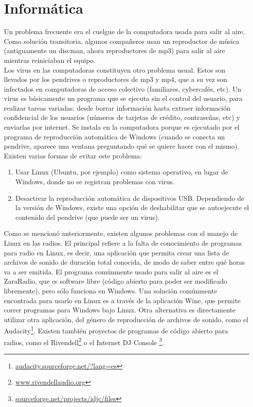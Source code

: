 \section{Informática}

\indent Un problema frecuente era el cuelgue de la computadora usada para salir al aire. Como solución transitoria, algunos compañeros usan un reproductor de música (antiguamente un discman, ahora reproductores de mp3) para salir al aire mientras reiniciaban el equipo.\\

\indent Los virus en las computadoras constituyen otro problema usual. Estos son llevados por los pendrives o reproductores de mp3 y mp4, que a su vez son infectados en computadoras de acceso colectivo (familiares, cybercafés, etc). Un virus es básicamente un programa que se ejecuta sin el control del usuario, para realizar tareas variadas: desde borrar información hasta extraer información confidencial de los usuarios (números de tarjetas de crédito, contraseñas, etc) y enviarlas por internet. Se instala en la computadora porque es ejecutado por el programa de reproducción automática de Windows (cuando se conecta un pendrive, aparece una ventana preguntando qué se quiere hacer con el mismo).\\

Existen varias formas de evitar este problema:

\begin{enumerate}
  \item Usar Linux (Ubuntu, por ejemplo) como sistema operativo, en lugar de Windows, donde no se registran problemas con virus.	
  \item Desactivar la reproducción automática de dispositivos USB. Dependiendo de la versión de Windows, existe una opción de deshabilitar que se autoejecute el contenido del pendrive (que puede ser un virus).
\end{enumerate}


\indent Como se mencionó anteriormente, existen algunos problemas con el manejo de Linux en las radios. El principal refiere a la falta de conocimiento de programas para radio en Linux, es decir, una aplicación que permita crear una lista de archivos de sonido de duración total conocida, de modo de saber entre qué horas va a ser emitida. El programa comúnmente usado para salir al aire es el ZaraRadio, que es software libre (código abierto para poder ser modificado libremente), pero sólo funciona en Windows. Una solución comúnmente encontrada para usarlo en Linux es a través de la aplicación Wine, que permite correr programas para Windows bajo Linux. Otra alternativa es directamente utilizar otra aplicación, del género de reproducción de archivos de sonido, como el Audacity\footnote{\href{http://audacity.sourceforge.net/?lang=es}{audacity.sourceforge.net/?lang=es}}. Existen también proyectos de programas de código abierto para radios, como el Rivendell\footnote{\href{http://www.rivendellaudio.org}{www.rivendellaudio.org}} o el Internet DJ Console \footnote{\href{http://sourceforge.net/projects/idjc/files}{sourceforge.net/projects/idjc/files}}.\\

